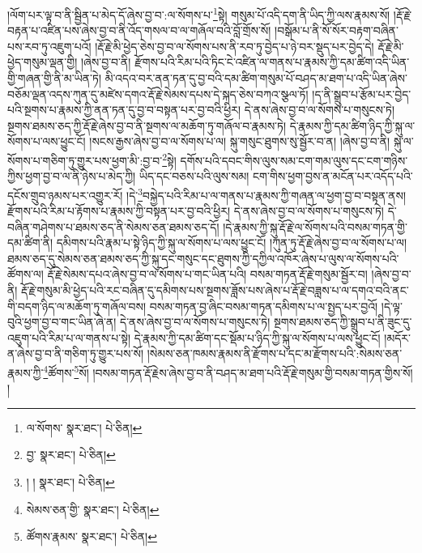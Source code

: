 །ལོག་པར་ལྟ་བ་ནི་སྦྱིན་པ་མེད་དོ་ཞེས་བྱ་བ་:ལ་སོགས་པ་\footnote{ལ་སོགས་  སྣར་ཐང་།  པེ་ཅིན། }སྟེ། གསུམ་པོ་འདི་དག་ནི་ཡིད་ཀྱི་ལས་རྣམས་སོ། །རྡོ་རྗེ་བརྟན་པ་འཛིན་པས་ཞེས་བྱ་བ་ནི་འོད་གསལ་བ་ལ་གཞོལ་བའི་བློ་གྲོས་སོ། །བསྒོམ་པ་ནི་སོ་སོར་བརྟག་བཞིན་པས་རབ་ཏུ་འཇུག་པའོ། །རྡོ་རྗེ་མི་ཕྱེད་ཅེས་བྱ་བ་ལ་སོགས་པས་ནི་རབ་ཏུ་བྱེད་པ་ཉེ་བར་སྡུད་པར་བྱེད་དེ། རྡོ་རྗེ་མི་ཕྱེད་གསུམ་ལྡན་གྱི། །ཞེས་བྱ་བ་ནི། རྫོགས་པའི་རིམ་པའི་ཏིང་ངེ་འཛིན་ལ་གནས་པ་རྣམས་ཀྱི་དམ་ཚིག་འདི་ཡིན་གྱི་གཞན་གྱི་ནི་མ་ཡིན་ཏེ། མི་འདའ་བར་ནན་ཏན་དུ་བྱ་བའི་དམ་ཚིག་གསུམ་པོ་བཤད་མ་ཐག་པ་འདི་ཡིན་ཞེས་བཅོམ་ལྡན་འདས་ཀུན་དུ་མཛེས་དགའ་རྡོ་རྗེ་སེམས་དཔས་དེ་སྐད་ཅེས་བཀའ་སྩལ་ཏོ། །ད་ནི་སྒྲུབ་པ་རྩོམ་པར་བྱེད་པའི་སྔགས་པ་རྣམས་ཀྱི་ནན་ཏན་དུ་བྱ་བ་བསྟན་པར་བྱ་བའི་ཕྱིར། དེ་ནས་ཞེས་བྱ་བ་ལ་སོགས་པ་གསུངས་ཏེ། སྔགས་ཐམས་ཅད་ཀྱི་རྡོ་རྗེ་ཞེས་བྱ་བ་ནི་སྔགས་ལ་མཆོག་ཏུ་གཞོལ་བ་རྣམས་ཏེ། དེ་རྣམས་ཀྱི་དམ་ཚིག་ཉིད་ཀྱི་སྐུ་ལ་སོགས་པ་ལས་ཕྱུང་ངོ། །སངས་རྒྱས་ཞེས་བྱ་བ་ལ་སོགས་པ་ལ། སྐུ་གསུང་ཐུགས་སུ་སྦྱོར་བ་ན། །ཞེས་བྱ་བ་ནི། སྐུ་ལ་སོགས་པ་གཅིག་ཏུ་གྱུར་པས་ཕྱག་མི་:བྱ་བ་\footnote{བྱ་  སྣར་ཐང་།  པེ་ཅིན། }སྟེ། དགོས་པའི་དབང་གིས་ལུས་སམ་ངག་གམ་ལུས་དང་ངག་གཉིས་ཀྱིས་ཕྱག་བྱ་བ་ལ་ནི་ཉེས་པ་མེད་ཀྱི། ཡིད་དང་བཅས་པའི་ལུས་སམ། ངག་གིས་ཕྱག་བྱས་ན་མངོན་པར་འདོད་པའི་དངོས་གྲུབ་ཉམས་པར་འགྱུར་རོ། །དེ་\footnote{། །  སྣར་ཐང་།  པེ་ཅིན། }བསྐྱེད་པའི་རིམ་པ་ལ་གནས་པ་རྣམས་ཀྱི་གཞན་ལ་ཕྱག་བྱ་བ་བསྟན་ནས། རྫོགས་པའི་རིམ་པ་རྟོགས་པ་རྣམས་ཀྱི་བསྟན་པར་བྱ་བའི་ཕྱིར། དེ་ནས་ཞེས་བྱ་བ་ལ་སོགས་པ་གསུངས་ཏེ། དེ་བཞིན་གཤེགས་པ་ཐམས་ཅད་ནི་སེམས་ཅན་ཐམས་ཅད་དོ། །དེ་རྣམས་ཀྱི་སྐུ་རྡོ་རྗེ་ལ་སོགས་པའི་བསམ་གཏན་གྱི་དམ་ཚིག་ནི། དམིགས་པའི་རྣམ་པ་སྟེ་ཉིད་ཀྱི་སྐུ་ལ་སོགས་པ་ལས་ཕྱུང་ངོ། །ཀུན་ཏུ་རྡོ་རྗེ་ཞེས་བྱ་བ་ལ་སོགས་པ་ལ། ཐམས་ཅད་དུ་སེམས་ཅན་ཐམས་ཅད་ཀྱི་སྐུ་དང་གསུང་དང་ཐུགས་ཀྱི་དཀྱིལ་འཁོར་ཞེས་པ་ལུས་ལ་སོགས་པའི་ཚོགས་ལ། རྡོ་རྗེ་སེམས་དཔའ་ཞེས་བྱ་བ་ལ་སོགས་པ་གང་ཡིན་པའི། བསམ་གཏན་རྡོ་རྗེ་གསུམ་སྦྱོར་བ། །ཞེས་བྱ་བ་ནི། རྡོ་རྗེ་གསུམ་མི་ཕྱེད་པའི་རང་བཞིན་དུ་དམིགས་པས་སྔགས་ཟློས་པས་ཞེས་པ་རྡོ་རྗེ་བཟླས་པ་ལ་དགའ་བའི་ནང་གི་བདག་ཉིད་ལ་མཆོག་ཏུ་གཞོལ་བས། བསམ་གཏན་བྱ་ཞིང་བསམ་གཏན་དམིགས་པ་ལ་སྤྱད་པར་བྱའོ། །དེ་ལྟ་བུའི་ཕྱག་བྱ་བ་གང་ཡིན་ཞེ་ན། དེ་ནས་ཞེས་བྱ་བ་ལ་སོགས་པ་གསུངས་ཏེ། སྔགས་ཐམས་ཅད་ཀྱི་སྒྲུབ་པ་ནི་ཟུང་དུ་འཇུག་པའི་རིམ་པ་ལ་གནས་པ་སྟེ། དེ་རྣམས་ཀྱི་དམ་ཚིག་དང་སྡོམ་པ་ཉིད་ཀྱི་སྐུ་ལ་སོགས་པ་ལས་ཕྱུང་ངོ། །མདོར་ན་ཞེས་བྱ་བ་ནི་གཅིག་ཏུ་གྱུར་པས་སོ། །སེམས་ཅན་ཁམས་རྣམས་ནི་རྫོགས་པ་དང་མ་རྫོགས་པའི་:སེམས་ཅན་རྣམས་ཀྱི་\footnote{སེམས་ཅན་གྱི་  སྣར་ཐང་།  པེ་ཅིན། }ཚོགས་\footnote{ཚོགས་རྣམས་  སྣར་ཐང་།  པེ་ཅིན། }སོ། །བསམ་གཏན་རྡོ་རྗེས་ཞེས་བྱ་བ་ནི་བཤད་མ་ཐག་པའི་རྡོ་རྗེ་གསུམ་གྱི་བསམ་གཏན་གྱིས་སོ། །
